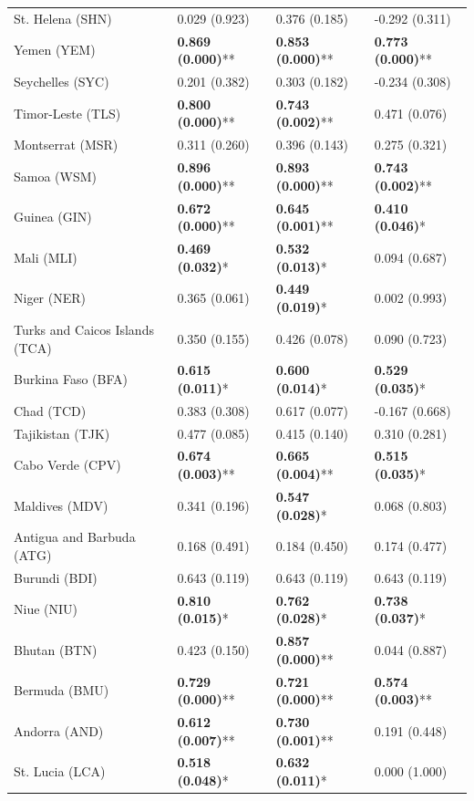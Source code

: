 \begin{longtable}{p{4cm}p{3cm}p{3cm}p{3cm}}
St. Helena (SHN) & 0.029 (0.923) & 0.376 (0.185) & -0.292 (0.311) \\
Yemen (YEM) & \textbf{0.869 (0.000)}** & \textbf{0.853 (0.000)}** & \textbf{0.773 (0.000)}** \\
Seychelles (SYC) & 0.201 (0.382) & 0.303 (0.182) & -0.234 (0.308) \\
Timor-Leste (TLS) & \textbf{0.800 (0.000)}** & \textbf{0.743 (0.002)}** & 0.471 (0.076) \\
Montserrat (MSR) & 0.311 (0.260) & 0.396 (0.143) & 0.275 (0.321) \\
Samoa (WSM) & \textbf{0.896 (0.000)}** & \textbf{0.893 (0.000)}** & \textbf{0.743 (0.002)}** \\
Guinea (GIN) & \textbf{0.672 (0.000)}** & \textbf{0.645 (0.001)}** & \textbf{0.410 (0.046)}* \\
Mali (MLI) & \textbf{0.469 (0.032)}* & \textbf{0.532 (0.013)}* & 0.094 (0.687) \\
Niger (NER) & 0.365 (0.061) & \textbf{0.449 (0.019)}* & 0.002 (0.993) \\
Turks and Caicos Islands (TCA) & 0.350 (0.155) & 0.426 (0.078) & 0.090 (0.723) \\
Burkina Faso (BFA) & \textbf{0.615 (0.011)}* & \textbf{0.600 (0.014)}* & \textbf{0.529 (0.035)}* \\
Chad (TCD) & 0.383 (0.308) & 0.617 (0.077) & -0.167 (0.668) \\
Tajikistan (TJK) & 0.477 (0.085) & 0.415 (0.140) & 0.310 (0.281) \\
Cabo Verde (CPV) & \textbf{0.674 (0.003)}** & \textbf{0.665 (0.004)}** & \textbf{0.515 (0.035)}* \\
Maldives (MDV) & 0.341 (0.196) & \textbf{0.547 (0.028)}* & 0.068 (0.803) \\
Antigua and Barbuda (ATG) & 0.168 (0.491) & 0.184 (0.450) & 0.174 (0.477) \\
Burundi (BDI) & 0.643 (0.119) & 0.643 (0.119) & 0.643 (0.119) \\
Niue (NIU) & \textbf{0.810 (0.015)}* & \textbf{0.762 (0.028)}* & \textbf{0.738 (0.037)}* \\
Bhutan (BTN) & 0.423 (0.150) & \textbf{0.857 (0.000)}** & 0.044 (0.887) \\
Bermuda (BMU) & \textbf{0.729 (0.000)}** & \textbf{0.721 (0.000)}** & \textbf{0.574 (0.003)}** \\
Andorra (AND) & \textbf{0.612 (0.007)}** & \textbf{0.730 (0.001)}** & 0.191 (0.448) \\
St. Lucia (LCA) & \textbf{0.518 (0.048)}* & \textbf{0.632 (0.011)}* & 0.000 (1.000) \\

\end{longtable}
